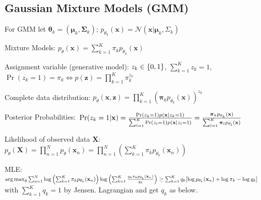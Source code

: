 \documentclass[a4paper, 11pt, landscape]{article}
\DeclareMathOperator*{\argmax}{arg\,max}
\begin{document}
\begin{multicols*}{3}
\section{Gaussian Mixture Models (GMM)}
For GMM let $\boldsymbol{\theta}_k = (\boldsymbol{\mu}_k, \boldsymbol{\Sigma}_k)$; $p_{\theta_k}(\mathbf{x}) = \mathcal{N}(\mathbf{x} | \boldsymbol{\mu}_k, \Sigma_k)$
\begin{compactdesc}
	\item[Mixture Models:] $p_\theta(\mathbf{x}) = \sum_{k=1}^K \pi_k p_{\theta_k}(\mathbf{x})$
	\item[Assignment variable (generative model):] $\\z_k \in \{0, 1\}$, $\sum_{k=1}^K z_k = 1$, $\operatorname{Pr}(z_k = 1) = \pi_k \Leftrightarrow p(\mathbf{z}) = \prod_{k=1}^K \pi_k^{z_k}$
	\item[Complete data distribution:] $p_\theta(\mathbf{x}, \mathbf{z}) = \prod_{k=1}^K \left( \boldsymbol{\pi}_k p_{\theta_k}(\mathbf{x})\right)^{z_k}$
	\item[Posterior Probabilities:] $\\\operatorname{Pr}(z_k = 1 | \mathbf{x}) = \frac{\operatorname{Pr}(z_k = 1) p(\mathbf{x} | z_k = 1)}{\sum_{l=1}^K \operatorname{Pr}(z_l = 1) p(\mathbf{x} | z_l = 1)} = \frac{\boldsymbol{\pi}_k p_{\theta_k}(\mathbf{x})}{\sum_{l=1}^K \boldsymbol{\pi}_l p_{\theta_l}(\mathbf{x})}$
	\item[Likelihood of observed data $\mathbf{X}$:] $p_\theta(\mathbf{X}) = \prod_{n=1}^N p_\theta(\mathbf{x}_n) = \prod_{n=1}^N \left(\sum_{k=1}^K \pi_k p_{\theta_k}(\mathbf{x}_n)\right)$
	\item[MLE:] $\argmax_\theta\sum_{n=1}^N \log \left( \sum_{k=1}^K \pi_k p_{\theta_k}(\mathbf{x}_n)\right) \break \log \left( \sum_{k=1}^K{\frac{q_k \pi_k p_{\theta_k}(\mathbf{x}_n)}{q_k}}\right) \ge \sum_{k=1}^K{q_k[\log p_{\theta_k}(\mathbf{x}_n) + \log \pi_k - \log q_k]}$ with $\sum_{k=1}^K{q_k} = 1$ by Jensen. Lagrangian and get $q_k$ as below.
\end{compactdesc}


\end{multicols*}
\end{document}
